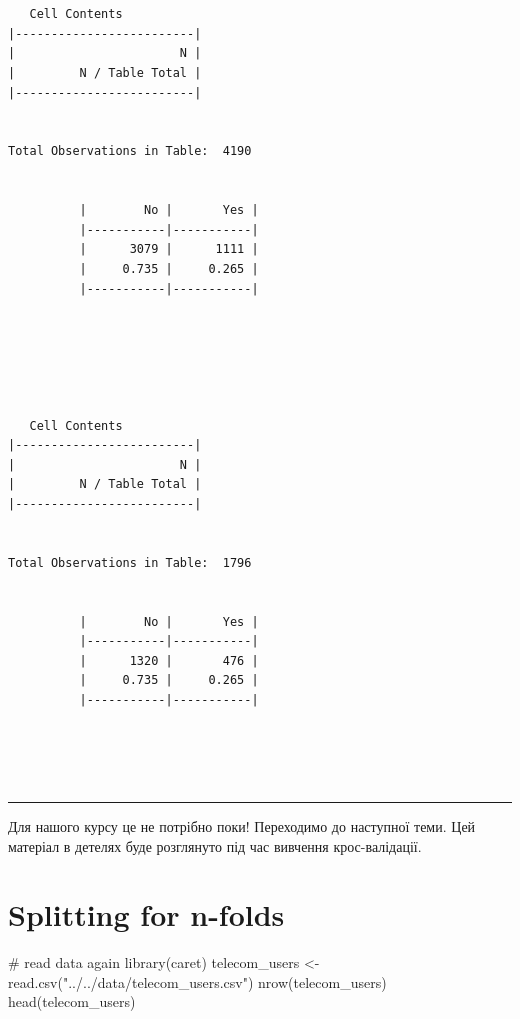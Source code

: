 \documentclass[
  letterpaper,
  DIV=11,
  numbers=noendperiod]{scrreprt}
\newenvironment{Shaded}{\begin{snugshade}}{\end{snugshade}}
\newcommand{\CommentTok}[1]{\textcolor[rgb]{0.37,0.37,0.37}{#1}}
\newcommand{\FunctionTok}[1]{\textcolor[rgb]{0.28,0.35,0.67}{#1}}
\newcommand{\NormalTok}[1]{\textcolor[rgb]{0.00,0.23,0.31}{#1}}
\newcommand{\OtherTok}[1]{\textcolor[rgb]{0.00,0.23,0.31}{#1}}
\newcommand{\SpecialCharTok}[1]{\textcolor[rgb]{0.37,0.37,0.37}{#1}}
\newcommand{\StringTok}[1]{\textcolor[rgb]{0.13,0.47,0.30}{#1}}
\begin{document}
\begin{Shaded}
\end{Shaded}

\begin{verbatim}

 
   Cell Contents
|-------------------------|
|                       N |
|         N / Table Total |
|-------------------------|

 
Total Observations in Table:  4190 

 
          |        No |       Yes | 
          |-----------|-----------|
          |      3079 |      1111 | 
          |     0.735 |     0.265 | 
          |-----------|-----------|



 

 
   Cell Contents
|-------------------------|
|                       N |
|         N / Table Total |
|-------------------------|

 
Total Observations in Table:  1796 

 
          |        No |       Yes | 
          |-----------|-----------|
          |      1320 |       476 | 
          |     0.735 |     0.265 | 
          |-----------|-----------|



 
\end{verbatim}

\begin{center}\rule{0.5\linewidth}{0.5pt}\end{center}

Для нашого курсу це не потрібно поки! Переходимо до наступної теми. Цей
матеріал в детелях буде розглянуто під час вивчення крос-валідації.

\section{Splitting for n-folds}\label{splitting-for-n-folds}

\begin{Shaded}
\begin{Highlighting}[]
\CommentTok{\# read data again}
\FunctionTok{library}\NormalTok{(caret)}
\NormalTok{telecom\_users }\OtherTok{\textless{}{-}} \FunctionTok{read.csv}\NormalTok{(}\StringTok{"../../data/telecom\_users.csv"}\NormalTok{)}
\FunctionTok{nrow}\NormalTok{(telecom\_users)}
\FunctionTok{head}\NormalTok{(telecom\_users)}
\end{Highlighting}
\end{Shaded}
\end{document}
